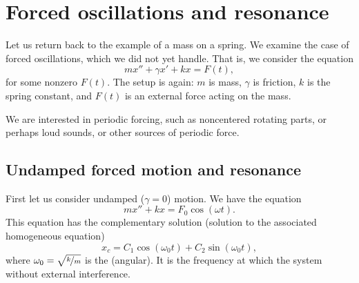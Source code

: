 \section{Forced oscillations and resonance} \label{forcedo:section}



\begin{mywrapfigsimp}{2.0in}{2.3in}
\noindent
{}
\end{mywrapfigsimp}
Let us return back to the example of a mass on a spring.  We examine
the case of forced oscillations, which we did not yet handle.  That is, we consider the equation
\begin{equation*}
mx'' + \gamma x' + kx = F(t) ,
\end{equation*}
for some nonzero $F(t)$.  The setup
is again: $m$ is mass, $\gamma$ is friction, $k$ is the spring constant, and
$F(t)$ is an external force acting on the mass.

We are interested in periodic
forcing, such as noncentered rotating parts, or perhaps loud sounds, or
other sources of periodic force.  %

\subsection{Undamped forced motion and resonance}

First let us consider undamped ($\gamma =0$) motion.
We have the equation
\begin{equation*}
mx'' + kx = F_0 \cos (\omega t) .
\end{equation*}
This equation has the complementary solution (solution to the associated homogeneous
equation)
\begin{equation*}
x_c = C_1 \cos (\omega_0 t) + C_2 \sin (\omega_0 t) ,
\end{equation*}
where $\omega_0 = \sqrt{\nicefrac{k}{m}}$ is the
\emph{} (angular).  It is the frequency
at which the system  without external interference.

